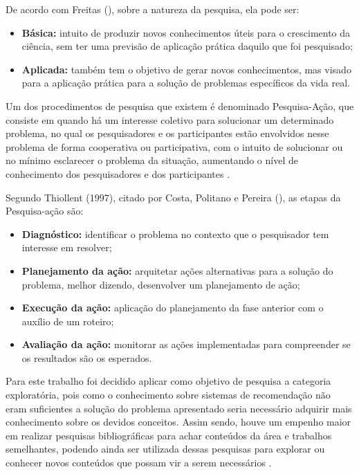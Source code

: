 De acordo com Freitas (\citeyear{de2013metodologia}), sobre a natureza da pesquisa, ela pode ser:

\begin{itemize}
    \item \textbf{Básica:} intuito de produzir novos conhecimentos úteis para o crescimento da ciência, sem ter uma previsão de aplicação prática daquilo que foi pesquisado;

    \item \textbf{Aplicada:} também tem o objetivo de gerar novos conhecimentos, mas visado para a aplicação prática para a solução de problemas específicos da vida real.
\end{itemize}

Um dos procedimentos de pesquisa que existem é denominado Pesquisa-Ação, que consiste em quando há um interesse coletivo para solucionar um determinado problema, no qual os pesquisadores e os participantes estão envolvidos nesse problema de forma cooperativa ou participativa, com o intuito de solucionar ou no mínimo esclarecer o problema da situação, aumentando o nível de conhecimento dos pesquisadores e dos participantes \cite{de2013metodologia}.

Segundo Thiollent (1997), citado por Costa, Politano e Pereira (\citeyear{Costa}), as etapas da Pesquisa-ação são:

\begin{itemize}
    \item \textbf{Diagnóstico:} identificar o problema no contexto que o pesquisador tem interesse em resolver;

    \item \textbf{Planejamento da ação:} arquitetar ações alternativas para a solução do problema, melhor dizendo, desenvolver um planejamento de ação;

    \item \textbf{Execução da ação:} aplicação do planejamento da fase anterior com o auxílio de um roteiro;

    \item \textbf{Avaliação da ação:} monitorar as ações implementadas para compreender se os resultados são os esperados.
\end{itemize}

Para este trabalho foi decidido aplicar como objetivo de pesquisa a categoria exploratória, pois como o conhecimento sobre sistemas de recomendação não eram suficientes a solução do problema apresentado seria necessário adquirir mais conhecimento sobre os devidos conceitos. Assim sendo, houve um empenho maior em realizar pesquisas bibliográficas para achar conteúdos da área e trabalhos semelhantes, podendo ainda ser utilizada dessas pesquisas para explorar ou conhecer novos conteúdos que possam vir a serem necessários \cite{Moretti:2018}.

